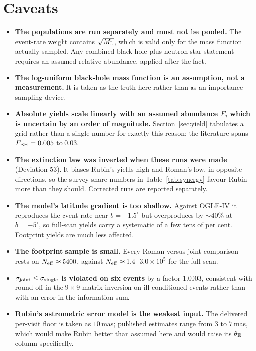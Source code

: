 \documentclass[english,10pt,a4paper]{article}
\newcommand{\tetE}{\theta_{\rm E}}
\newcommand{\Ml}{M_{\rm L}}
\newcommand{\Neff}{N_{\rm eff}}
\begin{document}
\section{Caveats}

\begin{itemize}
\item \textbf{The populations are run separately and must not be pooled.} The event-rate weight
      contains $\sqrt{\Ml}$, which is valid only for the mass function actually sampled. Any
      combined black-hole plus neutron-star statement requires an assumed relative abundance,
      applied after the fact.
\item \textbf{The log-uniform black-hole mass function is an assumption, not a measurement.} It
      is taken as the truth here rather than as an importance-sampling device.
\item \textbf{Absolute yields scale linearly with an assumed abundance $F$, which is uncertain by
      an order of magnitude.} Section~\ref{sec:yield} tabulates a grid rather than a single number
      for exactly this reason; the literature spans $F_{\rm BH} = 0.005$ to $0.03$.
\item \textbf{The extinction law was inverted when these runs were made} (Deviation 53). It biases
      Rubin's yields high and Roman's low, in opposite directions, so the survey-share numbers in
      Table~\ref{tab:synergy} favour Rubin more than they should. Corrected runs are reported
      separately.
\item \textbf{The model's latitude gradient is too shallow.} Against OGLE-IV it reproduces the
      event rate near $b=-1.5^\circ$ but overproduces by $\sim\!40\%$ at $b=-5^\circ$, so
      full-scan yields carry a systematic of a few tens of per cent. Footprint yields are much
      less affected.
\item \textbf{The footprint sample is small.} Every Roman-versus-joint comparison rests on
      $\Neff \approx 5400$, against $\Neff \approx 1.4$--$3.0\times10^5$ for the full scan.
\item \textbf{$\sigma_{\rm joint} \le \sigma_{\rm single}$ is violated on six events} by a factor
      $1.0003$, consistent with round-off in the $9\times9$ matrix inversion on ill-conditioned
      events rather than with an error in the information sum.
\item \textbf{Rubin's astrometric error model is the weakest input.} The delivered per-visit
      floor is taken as $10$\,mas; published estimates range from $3$ to $7$\,mas, which would
      make Rubin better than assumed here and would raise its $\tetE$ column specifically.
\end{itemize}
\end{document}
